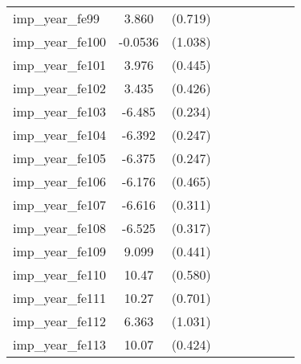 {\begin{tabular}{l*{4}{cc}}
imp\_year\_fe99&    3.860\sym{***}&  (0.719)&                  &         &                  &         &                  &         \\
imp\_year\_fe100&  -0.0536         &  (1.038)&                  &         &                  &         &                  &         \\
imp\_year\_fe101&    3.976\sym{***}&  (0.445)&                  &         &                  &         &                  &         \\
imp\_year\_fe102&    3.435\sym{***}&  (0.426)&                  &         &                  &         &                  &         \\
imp\_year\_fe103&   -6.485\sym{***}&  (0.234)&                  &         &                  &         &                  &         \\
imp\_year\_fe104&   -6.392\sym{***}&  (0.247)&                  &         &                  &         &                  &         \\
imp\_year\_fe105&   -6.375\sym{***}&  (0.247)&                  &         &                  &         &                  &         \\
imp\_year\_fe106&   -6.176\sym{***}&  (0.465)&                  &         &                  &         &                  &         \\
imp\_year\_fe107&   -6.616\sym{***}&  (0.311)&                  &         &                  &         &                  &         \\
imp\_year\_fe108&   -6.525\sym{***}&  (0.317)&                  &         &                  &         &                  &         \\
imp\_year\_fe109&    9.099\sym{***}&  (0.441)&                  &         &                  &         &                  &         \\
imp\_year\_fe110&    10.47\sym{***}&  (0.580)&                  &         &                  &         &                  &         \\
imp\_year\_fe111&    10.27\sym{***}&  (0.701)&                  &         &                  &         &                  &         \\
imp\_year\_fe112&    6.363\sym{***}&  (1.031)&                  &         &                  &         &                  &         \\
imp\_year\_fe113&    10.07\sym{***}&  (0.424)&                  &         &                  &         &                  &         \\

\end{tabular}}
